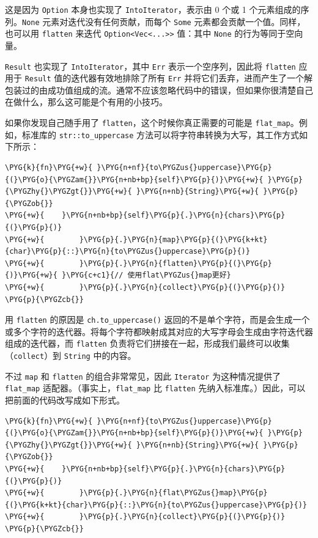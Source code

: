 这是因为 \texttt{Option} 本身也实现了 \texttt{IntoIterator}，表示由 0 个或 1 个元素组成的序列。\texttt{None} 元素对迭代没有任何贡献，而每个 \texttt{Some} 元素都会贡献一个值。同样，也可以用 \texttt{flatten} 来迭代 \texttt{Option<Vec<...>>} 值：其中 \texttt{None} 的行为等同于空向量。

\texttt{Result} 也实现了 \texttt{IntoIterator}，其中 \texttt{Err} 表示一个空序列，因此将 \texttt{flatten} 应用于 \texttt{Result} 值的迭代器有效地排除了所有 \texttt{Err} 并将它们丢弃，进而产生了一个解包装过的由成功值组成的流。通常不应该忽略代码中的错误，但如果你很清楚自己在做什么，那么这可能是个有用的小技巧。

如果你发现自己随手用了 \texttt{flatten}，这个时候你真正需要的可能是 \texttt{flat\_map}。例如，标准库的 \texttt{str::to\_uppercase} 方法可以将字符串转换为大写，其工作方式如下所示：

\begin{Verbatim}[commandchars=\\\{\},breaklines=true,breakanywhere=true,fontsize=\codefont,xleftmargin=17bp]
\PYG{k}{fn}\PYG{+w}{ }\PYG{n+nf}{to\PYGZus{}uppercase}\PYG{p}{(}\PYG{o}{\PYGZam{}}\PYG{n+nb+bp}{self}\PYG{p}{)}\PYG{+w}{ }\PYG{p}{\PYGZhy{}\PYGZgt{}}\PYG{+w}{ }\PYG{n+nb}{String}\PYG{+w}{ }\PYG{p}{\PYGZob{}}
\PYG{+w}{    }\PYG{n+nb+bp}{self}\PYG{p}{.}\PYG{n}{chars}\PYG{p}{(}\PYG{p}{)}
\PYG{+w}{        }\PYG{p}{.}\PYG{n}{map}\PYG{p}{(}\PYG{k+kt}{char}\PYG{p}{::}\PYG{n}{to\PYGZus{}uppercase}\PYG{p}{)}
\PYG{+w}{        }\PYG{p}{.}\PYG{n}{flatten}\PYG{p}{(}\PYG{p}{)}\PYG{+w}{ }\PYG{c+c1}{// 使用flat\PYGZus{}map更好}
\PYG{+w}{        }\PYG{p}{.}\PYG{n}{collect}\PYG{p}{(}\PYG{p}{)}
\PYG{p}{\PYGZcb{}}
\end{Verbatim}

用 \texttt{flatten} 的原因是 \texttt{ch.to\_uppercase()} 返回的不是单个字符，而是会生成一个或多个字符的迭代器。将每个字符都映射成其对应的大写字母会生成由字符迭代器组成的迭代器，而 \texttt{flatten} 负责将它们拼接在一起，形成我们最终可以收集（\texttt{collect}）到 \texttt{String} 中的内容。

不过 \texttt{map} 和 \texttt{flatten} 的组合非常常见，因此 \texttt{Iterator} 为这种情况提供了 \texttt{flat\_map} 适配器。（事实上，\texttt{flat\_map} 比 \texttt{flatten} 先纳入标准库。）因此，可以把前面的代码改写成如下形式。

\begin{Verbatim}[commandchars=\\\{\},breaklines=true,breakanywhere=true,fontsize=\codefont,xleftmargin=17bp]
\PYG{k}{fn}\PYG{+w}{ }\PYG{n+nf}{to\PYGZus{}uppercase}\PYG{p}{(}\PYG{o}{\PYGZam{}}\PYG{n+nb+bp}{self}\PYG{p}{)}\PYG{+w}{ }\PYG{p}{\PYGZhy{}\PYGZgt{}}\PYG{+w}{ }\PYG{n+nb}{String}\PYG{+w}{ }\PYG{p}{\PYGZob{}}
\PYG{+w}{    }\PYG{n+nb+bp}{self}\PYG{p}{.}\PYG{n}{chars}\PYG{p}{(}\PYG{p}{)}
\PYG{+w}{        }\PYG{p}{.}\PYG{n}{flat\PYGZus{}map}\PYG{p}{(}\PYG{k+kt}{char}\PYG{p}{::}\PYG{n}{to\PYGZus{}uppercase}\PYG{p}{)}
\PYG{+w}{        }\PYG{p}{.}\PYG{n}{collect}\PYG{p}{(}\PYG{p}{)}
\PYG{p}{\PYGZcb{}}
\end{Verbatim}

